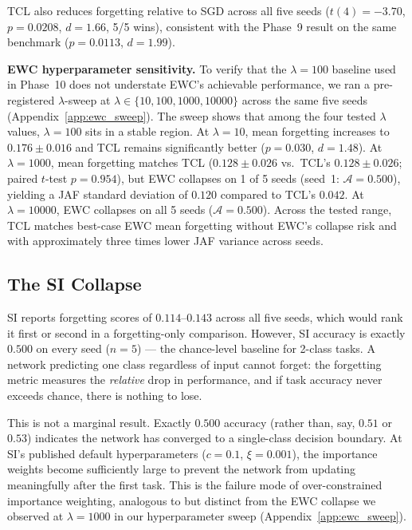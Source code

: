 TCL also reduces forgetting relative to SGD across all five seeds
($t(4) = -3.70$, $p = 0.0208$, $d = 1.66$, 5/5 wins), consistent with the
Phase~9 result on the same benchmark ($p = 0.0113$, $d = 1.99$).

\textbf{EWC hyperparameter sensitivity.}
To verify that the $\lambda=100$ baseline used in Phase~10 does not
understate EWC's achievable performance, we ran a pre-registered
$\lambda$-sweep at $\lambda \in \{10, 100, 1000, 10000\}$ across the same
five seeds (Appendix~\ref{app:ewc_sweep}).
The sweep shows that among the four tested $\lambda$ values,
$\lambda=100$ sits in a stable region.
At $\lambda=10$, mean forgetting increases to $0.176 \pm 0.016$ and TCL
remains significantly better ($p = 0.030$, $d = 1.48$).
At $\lambda=1000$, mean forgetting matches TCL ($0.128 \pm 0.026$ vs.\
TCL's $0.128 \pm 0.026$; paired $t$-test $p = 0.954$), but EWC
collapses on 1 of 5 seeds (seed~1: $\mathcal{A} = 0.500$), yielding a
JAF standard deviation of $0.120$ compared to TCL's $0.042$.
At $\lambda=10000$, EWC collapses on all 5 seeds ($\mathcal{A} = 0.500$).
Across the tested range, TCL matches best-case EWC mean forgetting
without EWC's collapse risk and with approximately three times lower
JAF variance across seeds.

\subsection{The SI Collapse}
\label{sec:si_collapse}

SI reports forgetting scores of $0.114$--$0.143$ across all five seeds, which would
rank it first or second in a forgetting-only comparison.
However, SI accuracy is exactly $0.500$ on every seed ($n=5$) --- the
chance-level baseline for 2-class tasks.
A network predicting one class regardless of input cannot forget: the forgetting metric
measures the \emph{relative} drop in performance, and if task accuracy never exceeds
chance, there is nothing to lose.

This is not a marginal result.
Exactly $0.500$ accuracy (rather than, say, $0.51$ or $0.53$) indicates the network
has converged to a single-class decision boundary.
At SI's published default hyperparameters ($c=0.1$, $\xi=0.001$), the importance
weights become sufficiently large to prevent the network from updating meaningfully
after the first task.
This is the failure mode of over-constrained importance weighting, analogous to but
distinct from the EWC collapse we observed at $\lambda=1000$ in our hyperparameter
sweep (Appendix~\ref{app:ewc_sweep}).

